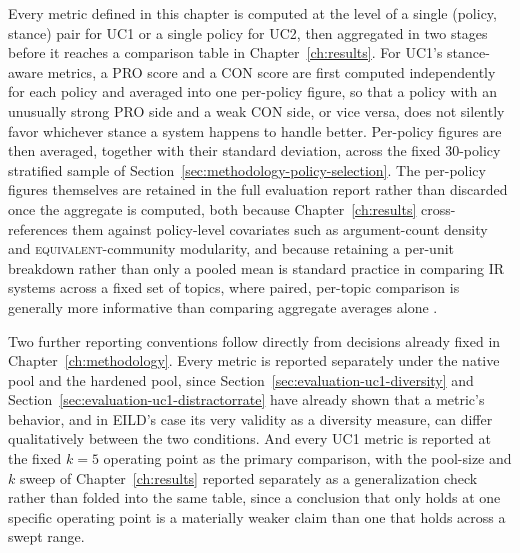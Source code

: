 Every metric defined in this chapter is computed at the level of a single (policy, stance) pair for
UC1 or a single policy for UC2, then aggregated in two stages before it reaches a comparison table
in Chapter~\ref{ch:results}. For UC1's stance-aware metrics, a PRO score and a CON score are first
computed independently for each policy and averaged into one per-policy figure, so that a policy
with an unusually strong PRO side and a weak CON side, or vice versa, does not silently favor
whichever stance a system happens to handle better. Per-policy figures are then averaged, together
with their standard deviation, across the fixed 30-policy stratified sample of
Section~\ref{sec:methodology-policy-selection}. The per-policy figures themselves are retained in
the full evaluation report rather than discarded once the aggregate is computed, both because
Chapter~\ref{ch:results} cross-references them against policy-level covariates such as argument-count
density and \textsc{equivalent}-community modularity, and because retaining a per-unit breakdown
rather than only a pooled mean is standard practice in comparing IR systems across a fixed set of
topics, where paired, per-topic comparison is generally more informative than comparing aggregate
averages alone \cite{smucker2007significance,demsar2006statistical}.

Two further reporting conventions follow directly from decisions already fixed in
Chapter~\ref{ch:methodology}. Every metric is reported separately under the native pool and the
hardened pool, since Section~\ref{sec:evaluation-uc1-diversity} and
Section~\ref{sec:evaluation-uc1-distractorrate} have already shown that a metric's behavior, and in
EILD's case its very validity as a diversity measure, can differ qualitatively between the two
conditions. And every UC1 metric is reported at the fixed $k=5$ operating point as the primary
comparison, with the pool-size and $k$ sweep of Chapter~\ref{ch:results} reported separately as a
generalization check rather than folded into the same table, since a conclusion that only holds at
one specific operating point is a materially weaker claim than one that holds across a swept range.

